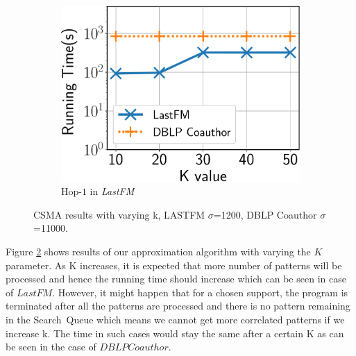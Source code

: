 \begin{figure}
	\vspace{4mm}
	\centering
	\begin{subfigure}[b]{0.25\textwidth}
		\includegraphics[keepaspectratio,scale=0.25]{img2/lastfm/lastfm_K_var_f.pdf}
		\caption{\scriptsize {\sf Hop-$1$} in {\em LastFM}}
		\label{fig:lastfm_k}
	\end{subfigure}%
	
	\vspace{-2mm}
	\caption{\scriptsize CSMA results with varying k, LASTFM $\sigma$=1200, DBLP Coauthor $\sigma$=11000.}
	\label{fig:approx_k}
	\vspace{-2mm}
\end{figure}


\par Figure \ref{fig:approx_k} shows results of our approximation algorithm with varying the $K$ parameter. As K increases, it is expected that more number of patterns will be processed and hence the running time should increase which can be seen in case of $LastFM$. However, it might happen that for a chosen support, the program is terminated after all the patterns are processed and there is no pattern remaining in the {\sf Search\ Queue} which means we cannot get more correlated patterns if we increase k. The time in such cases would stay the same after a certain K as can be seen in the case of $DBLP Coauthor$.



